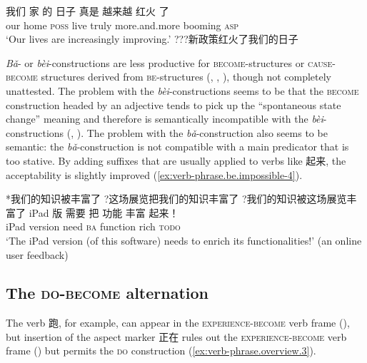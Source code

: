\documentclass[UTF8, a4paper, oneside, scheme=plain, 12pt]{ctexrep}
\newcommand{\form}[1]{\emph{#1}}
\newcommand{\translate}[1]{`#1'}
\newcommand*{\category}[1]{\textsc{#1}}
\begin{document}
\begin{exe}
    \ex\label{ex:verb-phrase.be-become.2} 
    \gll 我们 家 的 日子 真是 越来越 红火 了 \\
    our home \category{poss} live truly more.and.more booming \category{asp} \\
    \glt \translate{Our lives are increasingly improving.}
    \ex\label{ex:verb-phrase.be-become.cause-2} ???新政策红火了我们的日子
\end{exe}

\form{Bǎ}- or \form{bèi}-constructions are less productive 
for \category{become}-structures or \category{cause}-\category{become} structures 
derived from \category{be}-structures 
(,
,
),
though not completely unattested.
The problem with the \form{bèi}-constructions
seems to be that the \category{become} construction 
headed by an adjective tends to pick up the 
``spontaneous state change'' meaning 
and therefore is semantically incompatible with 
the \form{bèi}-constructions
(,
).
The problem with the \form{bǎ}-construction 
also seems to be semantic:
the \form{bǎ}-construction is not compatible with 
a main predicator that is too stative. 
By adding suffixes that are usually applied to verbs like 起来, 
the acceptability is slightly improved 
(\ref{ex:verb-phrase.be.impossible-4}).

\begin{exe}
    \ex\label{ex:verb-phrase.be.impossible-1} *我们的知识被丰富了
    \ex\label{ex:verb-phrase.be.impossible-2} ?这场展览把我们的知识丰富了
    \ex\label{ex:verb-phrase.be.impossible-3} ?我们的知识被这场展览丰富了
    \ex\label{ex:verb-phrase.be.impossible-4}
    \gll  iPad 版 需要 把 功能 丰富 起来！\\ 
    iPad version need \category{ba} function rich \category{todo} \\ 
    \glt \translate{The iPad version (of this software) needs to enrich its functionalities!} 
    (an online user feedback)
\end{exe}

\subsection{The \category{do}-\category{become} alternation}\label{sec:ver-phrase.gei}

The verb 跑, for example, 
can appear in the \category{experience}-\category{become} verb frame  
(), 
but insertion of the aspect marker 正在 
rules out the \category{experience}-\category{become} verb frame 
()
but permits the \category{do} construction 
(\ref{ex:verb-phrase.overview.3}).
\end{document}
